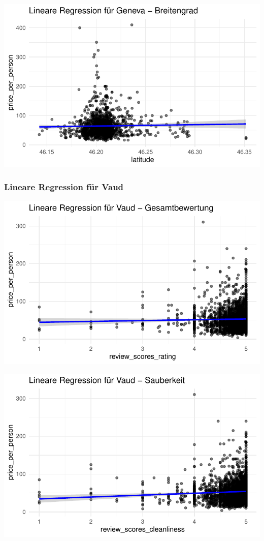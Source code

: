 \documentclass[
  journal,
]{IEEEtran}%
\begin{document}
\includegraphics{main_files/figure-pdf/unnamed-chunk-16-8.pdf}

\subsubsection{Lineare Regression für
Vaud}\label{lineare-regression-fuxfcr-vaud}

\includegraphics{main_files/figure-pdf/unnamed-chunk-17-1.pdf}

\includegraphics{main_files/figure-pdf/unnamed-chunk-17-2.pdf}
\end{document}
